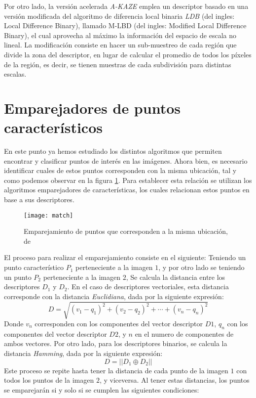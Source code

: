 Por otro lado, la versión acelerada \textit{A-KAZE} emplea un descriptor basado en una versión modificada del algoritmo de diferencia local binaria \textit{LDB} \cite{ldb} (del ingles: Local Difference Binary), llamado M-LBD (del ingles: Modified Local Difference Binary), el cual aprovecha al máximo la información del espacio de escala no lineal. La modificación consiste en hacer un sub-muestreo de cada región que divide la zona del descriptor, en lugar de calcular el promedio de todos los píxeles de la región, es decir, se tienen muestras de cada subdivisión para distintas escalas.


\section{Emparejadores de puntos característicos}

En este punto ya hemos estudiado los distintos algoritmos que permiten encontrar y clasificar puntos de interés en las imágenes. Ahora bien, es necesario identificar cuales de estos puntos corresponden con la misma ubicación, tal y como podemos observar en la figura \ref*{imagen:match}. Para establecer esta relación se utilizan los algoritmos emparejadores de características, los cuales relacionan estos puntos en base a sus descriptores.

\begin{figure}[H]
	\centering
	\texttt{[image: match]}
	\caption[Emparejamiento de puntos característicos]{Emparejamiento de puntos que corresponden a la misma ubicación, de \cite{comp-vision} }
	\label{imagen:match}
\end{figure}

El proceso para realizar el emparejamiento consiste en el siguiente: Teniendo un punto característico $P_{1}$ perteneciente a la imagen $1$, y por otro lado se teniendo un punto $P_{2}$ perteneciente a la imagen $2$, Se calcula la distancia entre los descriptores $D_{1}$ y $D_{2}$. En el caso de descriptores vectoriales, esta distancia corresponde con la distancia \textit{Euclidiana}, dada por la siguiente expresión:
\begin{displaymath}
D = \sqrt{ (v_{1}-q_{1})^2 + (v_{2}-q_{2})^2 + \cdots + (v_{n}-q_{n})^2 }
\end{displaymath}
Donde $v_{n}$ corresponden con los componentes del vector descriptor $D1$, $q_{n}$ con los componentes del vector descriptor $D2$, y $n$ en el numero de componentes de ambos vectores. Por otro lado, para los descriptores binarios, se calcula la distancia \textit{Hamming}, dada por la siguiente expresión:
\begin{displaymath}
D = ||D_{1} \oplus D_{2}||
\end{displaymath}
Este proceso se repite hasta tener la distancia de cada punto de la imagen $1$ con todos los puntos de la imagen $2$, y viceversa. Al tener estas distancias, los puntos se emparejarán si y solo si se cumplen las siguientes condiciones: 

